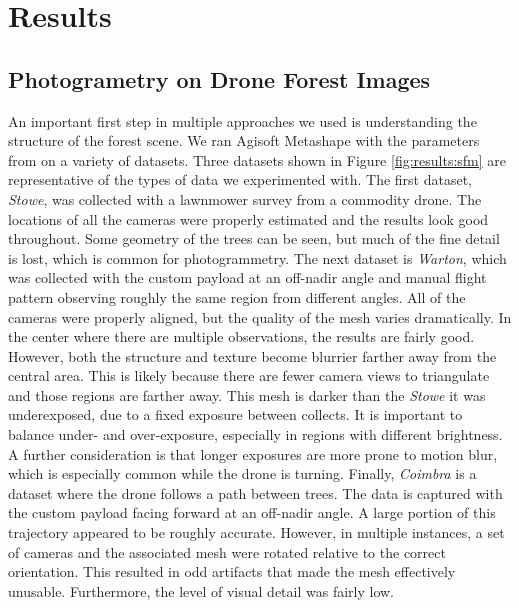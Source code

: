 \chapter{Results} \label{chapResults}
\section{Photogrametry on Drone Forest Images}
An important first step in multiple approaches we used is understanding the structure of the forest scene. We ran Agisoft Metashape with the parameters from \cite{Young2022} on a variety of datasets. Three datasets shown in Figure \ref{fig:results:sfm} are representative of the types of data we experimented with. The first dataset, \textit{Stowe}, was collected with a lawnmower survey from a commodity drone. The locations of all the cameras were properly estimated and the results look good throughout. Some geometry of the trees can be seen, but much of the fine detail is lost, which is common for photogrammetry. The next dataset is \textit{Warton}, which was collected with the custom payload at an off-nadir angle and manual flight pattern observing roughly the same region from different angles. All of the cameras were properly aligned, but the quality of the mesh varies dramatically. In the center where there are multiple observations, the results are fairly good. However, both the structure and texture become blurrier farther away from the central area. This is likely because there are fewer camera views to triangulate and those regions are farther away. This mesh is darker than the \textit{Stowe} it was underexposed, due to a fixed exposure between collects. It is important to balance under- and over-exposure, especially in regions with different brightness. A further consideration is that longer exposures are more prone to motion blur, which is especially common while the drone is turning.
Finally, \textit{Coimbra} is a dataset where the drone follows a path between trees. The data is captured with the custom payload facing forward at an off-nadir angle. A large portion of this trajectory appeared to be roughly accurate. However, in multiple instances, a set of cameras and the associated mesh were rotated relative to the correct orientation. This resulted in odd artifacts that made the mesh effectively unusable. Furthermore, the level of visual detail was fairly low.


